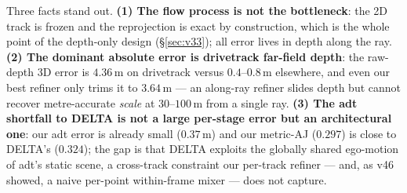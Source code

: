 \documentclass[11pt,a4paper]{article}
\begin{document}
Three facts stand out. \textbf{(1) The flow process is not the bottleneck}: the 2D track is frozen and the
reprojection is exact by construction, which is the whole point of the depth-only design (\S\ref{sec:v33});
all error lives in depth along the ray. \textbf{(2) The dominant absolute error is drivetrack far-field
depth}: the raw-depth 3D error is $4.36$\,m on drivetrack versus $0.4$--$0.8$\,m elsewhere, and even our best
refiner only trims it to $3.64$\,m --- an along-ray refiner slides depth but cannot recover metre-accurate
\emph{scale} at $30$--$100$\,m from a single ray. \textbf{(3) The adt shortfall to DELTA is not a large
per-stage error but an architectural one}: our adt error is already small ($0.37$\,m) and our metric-AJ
($0.297$) is close to DELTA's ($0.324$); the gap is that DELTA exploits the globally shared ego-motion of
adt's static scene, a cross-track constraint our per-track refiner --- and, as v46 showed, a naive per-point
within-frame mixer --- does not capture.
\end{document}
